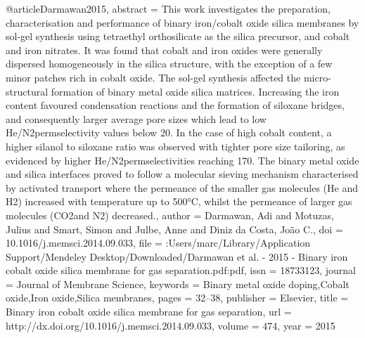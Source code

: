 @article{Darmawan2015,
abstract = {This work investigates the preparation, characterisation and performance of binary iron/cobalt oxide silica membranes by sol-gel synthesis using tetraethyl orthosilicate as the silica precursor, and cobalt and iron nitrates. It was found that cobalt and iron oxides were generally dispersed homogeneously in the silica structure, with the exception of a few minor patches rich in cobalt oxide. The sol-gel synthesis affected the micro-structural formation of binary metal oxide silica matrices. Increasing the iron content favoured condensation reactions and the formation of siloxane bridges, and consequently larger average pore sizes which lead to low He/N2permselectivity values below 20. In the case of high cobalt content, a higher silanol to siloxane ratio was observed with tighter pore size tailoring, as evidenced by higher He/N2permselectivities reaching 170. The binary metal oxide and silica interfaces proved to follow a molecular sieving mechanism characterised by activated transport where the permeance of the smaller gas molecules (He and H2) increased with temperature up to 500°C, whilst the permeance of larger gas molecules (CO2and N2) decreased.},
author = {Darmawan, Adi and Motuzas, Julius and Smart, Simon and Julbe, Anne and {Diniz da Costa}, Jo{\~{a}}o C.},
doi = {10.1016/j.memsci.2014.09.033},
file = {:Users/marc/Library/Application Support/Mendeley Desktop/Downloaded/Darmawan et al. - 2015 - Binary iron cobalt oxide silica membrane for gas separation.pdf:pdf},
issn = {18733123},
journal = {Journal of Membrane Science},
keywords = {Binary metal oxide doping,Cobalt oxide,Iron oxide,Silica membranes},
pages = {32--38},
publisher = {Elsevier},
title = {{Binary iron cobalt oxide silica membrane for gas separation}},
url = {http://dx.doi.org/10.1016/j.memsci.2014.09.033},
volume = {474},
year = {2015}
}
